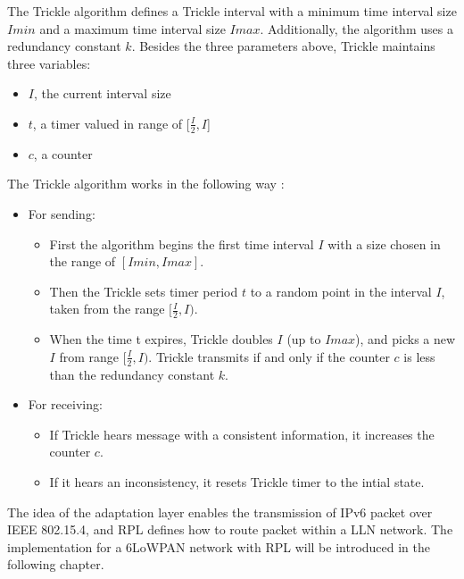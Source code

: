 The Trickle algorithm defines a Trickle interval with a minimum time interval size $Imin$ and a maximum time interval size $Imax$. Additionally, the algorithm uses a redundancy constant $k$. Besides the three parameters above, Trickle maintains three variables:
\begin{itemize}
 \item $I$, the current interval size
 \newline
 
 \item $t$, a timer valued in range of [$\frac{I}{2}, I$]
 \newline
 
 \item $c$, a counter
\end{itemize}

The Trickle algorithm works in the following way \cite{RFC 6206}:
\begin{itemize}
\item For sending:
  \begin{itemize}
  \item First the algorithm begins the first time interval $I$ with a size chosen in the range of $[Imin, Imax]$.
  
  \item Then the Trickle sets timer period $t$ to a random point in the interval $I$, taken from the range $[\frac{I}{2}, I)$.
  
   \item When the time t expires, Trickle doubles $I$ (up to $Imax$), and picks a new $I$ from range $[\frac{I}{2}, I)$.  Trickle transmits if and only if the counter $c$ is less than the redundancy constant $k$.
  \end{itemize}  
  
\item For receiving:
 \begin{itemize}
 \item If Trickle hears message with a consistent information, it increases the counter $c$.
 
 \item If it hears an inconsistency, it resets Trickle timer to the intial state.
 \end{itemize}
\end{itemize}

The idea of the adaptation layer enables the transmission of IPv6 packet over IEEE 802.15.4, and RPL defines how to route packet within a LLN network. The implementation for a 6LoWPAN network with RPL will be introduced in the following chapter.







